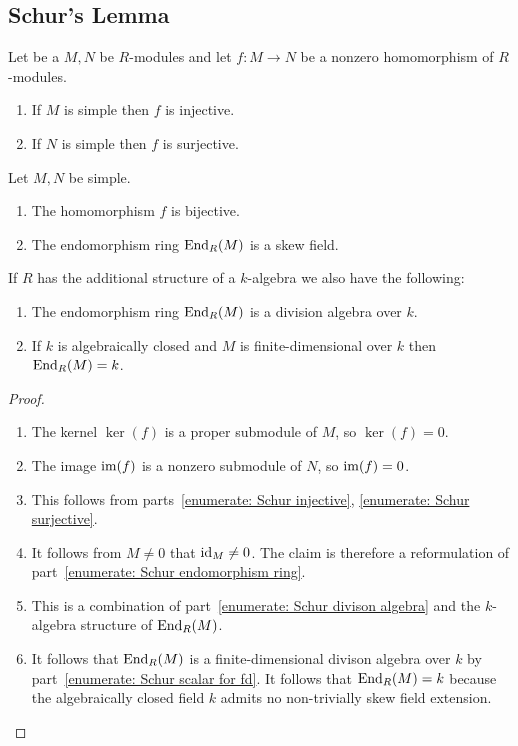 \subsection{Schur’s Lemma}


\begin{proposition}
  \label{proposition: schurs lemma for modules}
  Let be a $M, N$ be $R$-modules and let $f \colon M \to N$ be a nonzero homomorphism of $R$-modules.
  \begin{enumerate}
    \item
      \label{enumerate: Schur injective}
      If $M$ is simple then $f$ is injective.
    \item
      \label{enumerate: Schur surjective}
      If $N$ is simple then $f$ is surjective.
  \end{enumerate}
  Let $M, N$ be simple.
  \begin{enumerate}[resume]
    \item
      \label{enumerate: Schur bijective}
      The homomorphism $f$ is bijective.
    \item
      \label{enumerate: Schur endomorphism ring}
      The endomorphism ring $\operatorname{End}_R(M)$ is a skew field.
  \end{enumerate}
  If $R$ has the additional structure of a $k$-algebra we also have the following:
  \begin{enumerate}[resume]
    \item
      \label{enumerate: Schur divison algebra}
      The endomorphism ring $\operatorname{End}_R(M)$ is a division algebra over $k$.
    \item
      \label{enumerate: Schur scalar for fd}
      If $k$ is algebraically closed and $M$ is finite-dimensional over $k$ then $\operatorname{End}_R(M) = k$.
  \end{enumerate}
\end{proposition}


\begin{proof}
  \leavevmode
  \begin{enumerate}
    \item
      The kernel $\ker(f)$ is a proper submodule of $M$, so $\ker(f) = 0$.
    \item
      The image $\operatorname{im}(f)$ is a nonzero submodule of $N$, so $\operatorname{im}(f) = 0$.
    \item
      This follows from parts~\ref*{enumerate: Schur injective}, \ref*{enumerate: Schur surjective}.
    \item
      It follows from $M \neq 0$ that $\operatorname{id}_M \neq 0$.
      The claim is therefore a reformulation of part~\ref*{enumerate: Schur endomorphism ring}.
    \item
      This is a combination of part~\ref*{enumerate: Schur divison algebra} and the $k$-algebra structure of $\operatorname{End}_R(M)$.
    \item
      It follows that $\operatorname{End}_R(M)$ is a finite-dimensional divison algebra over $k$ by part~\ref*{enumerate: Schur scalar for fd}.
      It follows that $\operatorname{End}_R(M) = k$ because the algebraically closed field $k$ admits no non-trivially skew field extension.
    \qedhere
  \end{enumerate}
\end{proof}


